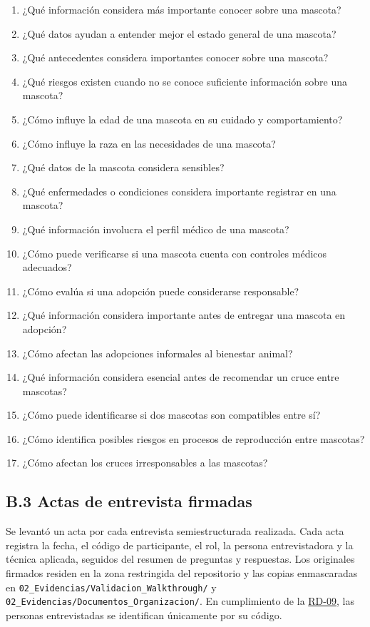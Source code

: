 \documentclass[journal,onecolumn]{IEEEtran}
\begin{document}
	\begin{enumerate}[leftmargin=*, itemsep=1pt]
		\item ¿Qué información considera más importante conocer sobre una mascota?
		\item ¿Qué datos ayudan a entender mejor el estado general de una mascota?
		\item ¿Qué antecedentes considera importantes conocer sobre una mascota?
		\item ¿Qué riesgos existen cuando no se conoce suficiente información sobre una mascota?
		\item ¿Cómo influye la edad de una mascota en su cuidado y comportamiento?
		\item ¿Cómo influye la raza en las necesidades de una mascota?
		\item ¿Qué datos de la mascota considera sensibles?
		\item ¿Qué enfermedades o condiciones considera importante registrar en una mascota?
		\item ¿Qué información involucra el perfil médico de una mascota?
		\item ¿Cómo puede verificarse si una mascota cuenta con controles médicos adecuados?
		\item ¿Cómo evalúa si una adopción puede considerarse responsable?
		\item ¿Qué información considera importante antes de entregar una mascota en adopción?
		\item ¿Cómo afectan las adopciones informales al bienestar animal?
		\item ¿Qué información considera esencial antes de recomendar un cruce entre mascotas?
		\item ¿Cómo puede identificarse si dos mascotas son compatibles entre sí?
		\item ¿Cómo identifica posibles riesgos en procesos de reproducción entre mascotas?
		\item ¿Cómo afectan los cruces irresponsables a las mascotas?
	\end{enumerate}
	
	
	\subsection*{B.3 Actas de entrevista firmadas}
	
	Se levantó un acta por cada entrevista semiestructurada realizada. Cada
	acta registra la fecha, el código de participante, el rol, la persona
	entrevistadora y la técnica aplicada, seguidos del resumen de preguntas y
	respuestas. Los originales firmados residen en la zona restringida del
	repositorio y las copias enmascaradas en
	\texttt{02\_Evidencias/Validacion\_Walkthrough/} y
	\texttt{02\_Evidencias/Documentos\_Organizacion/}. En cumplimiento de la
	\hyperref[tab:RD-09]{RD-09}, las personas entrevistadas se identifican únicamente por su código.
	
\end{document}
